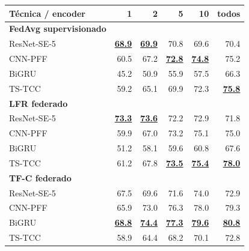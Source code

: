 \begin{tabular}{lrrrrr}
\toprule
\textbf{Técnica / encoder} & \textbf{1} & \textbf{2} & \textbf{5} & \textbf{10} & \textbf{todos} \\
\midrule
\textbf{FedAvg supervisionado} &  &  &  &  &  \\
\quad ResNet-SE-5 & \underline{\textbf{68.9}} & \underline{\textbf{69.9}} & 70.8 & 69.6 & 70.4 \\
\quad CNN-PFF & 60.5 & 67.2 & \underline{\textbf{72.8}} & \underline{\textbf{74.8}} & 75.2 \\
\quad BiGRU & 45.2 & 50.9 & 55.9 & 57.5 & 66.3 \\
\quad TS-TCC & 59.2 & 65.1 & 69.9 & 72.3 & \underline{\textbf{75.8}} \\
\textbf{LFR federado} &  &  &  &  &  \\
\quad ResNet-SE-5 & \underline{\textbf{73.3}} & \underline{\textbf{73.6}} & 72.2 & 72.9 & 71.8 \\
\quad CNN-PFF & 59.9 & 67.0 & 73.2 & 75.1 & 75.0 \\
\quad BiGRU & 51.2 & 58.1 & 59.6 & 60.8 & 67.6 \\
\quad TS-TCC & 61.2 & 67.8 & \underline{\textbf{73.5}} & \underline{\textbf{75.4}} & \underline{\textbf{78.0}} \\
\textbf{TF-C federado} &  &  &  &  &  \\
\quad ResNet-SE-5 & 67.5 & 69.6 & 71.6 & 74.0 & 72.9 \\
\quad CNN-PFF & 65.9 & 73.0 & 76.3 & 78.0 & 79.3 \\
\quad BiGRU & \underline{\textbf{68.8}} & \underline{\textbf{74.4}} & \underline{\textbf{77.3}} & \underline{\textbf{79.6}} & \underline{\textbf{80.8}} \\
\quad TS-TCC & 58.9 & 64.4 & 68.2 & 70.1 & 72.8 \\
\bottomrule
\end{tabular}
